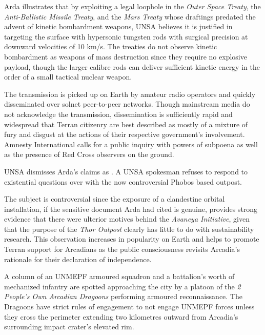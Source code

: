 Arda illustrates that by exploiting a legal loophole in the {\it Outer Space Treaty}, the {\it Anti-Ballistic Missile Treaty}, and the {\it Mars Treaty} whose draftings predated the advent of kinetic bombardment weapons, UNSA believes it is justified in targeting the surface with hypersonic tungsten rods with surgical precision at downward velocities of 10 km/s. The treaties do not observe kinetic bombardment as weapons of mass destruction since they require no explosive payload, though the larger calibre rods can deliver sufficient kinetic energy in the order of a small tactical nuclear weapon.

The transmission is picked up on Earth by amateur radio operators and quickly disseminated over solnet peer-to-peer networks. Though mainstream media do not acknowledge the transmission, dissemination is sufficiently rapid and widespread that Terran citizenry are best described as mostly of a mixture of fury and disgust at the actions of their respective government's involvement. Amnesty International calls for a public inquiry with powers of subpoena as well as the presence of Red Cross observers on the ground.

UNSA dismisses Arda's claims as . A UNSA spokesman refuses to respond to existential questions over with the now controversial Phobos based outpost. 

The subject is controversial since the exposure of a clandestine orbital installation, if the sensitive document Arda had cited is genuine, provides strong evidence that there were ulterior motives behind the {\it Avaneya Initiative}, given that the purpose of the {\it Thor Outpost} clearly has little to do with sustainability research. This observation increases in popularity on Earth and helps to promote Terran support for Arcadians as the public consciousness revisits Arcadia's rationale for their declaration of independence.
\StopTimelineDate

A column of an UNMEPF armoured squadron and a battalion's worth of mechanized infantry are spotted approaching the city by a platoon of the {\it 2 People's Own Arcadian Dragoons} performing armoured reconnaissance. The Dragoons have strict rules of engagement to not engage UNMEPF forces unless they cross the perimeter extending two kilometres outward from Arcadia's surrounding impact crater's elevated rim.

